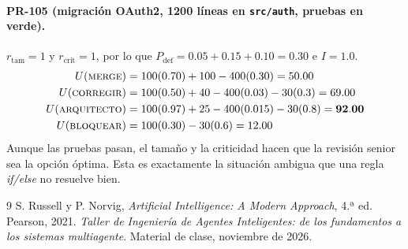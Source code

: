 \documentclass[11pt,a4paper]{article}
\newcommand{\Pdef}{P_{\text{def}}}
\begin{document}
\paragraph{PR-105 (migración OAuth2, 1200 líneas en \texttt{src/auth}, pruebas en verde).}
$r_{\text{tam}}=1$ y $r_{\text{crit}}=1$, por lo que $\Pdef = 0.05 + 0.15 + 0.10 = 0.30$ e $I=1.0$.
\begin{align*}
U(\textsc{merge}) &= 100(0.70) + 100 - 400(0.30) = 50.00\\
U(\textsc{corregir}) &= 100(0.50) + 40 - 400(0.03) - 30(0.3) = 69.00\\
U(\textsc{arquitecto}) &= 100(0.97) + 25 - 400(0.015) - 30(0.8) = \mathbf{92.00}\\
U(\textsc{bloquear}) &= 100(0.30) - 30(0.6) = 12.00
\end{align*}
Aunque las pruebas pasan, el tamaño y la criticidad hacen que la revisión senior sea la opción
óptima. Esta es exactamente la situación ambigua que una regla \textit{if/else} no resuelve bien.

\begin{thebibliography}{9}
 S. Russell y P. Norvig, \textit{Artificial Intelligence: A Modern Approach}, 4.ª ed. Pearson, 2021.
 \textit{Taller de Ingeniería de Agentes Inteligentes: de los fundamentos a los sistemas multiagente}. Material de clase, noviembre de 2026.
\end{thebibliography}
\end{document}
